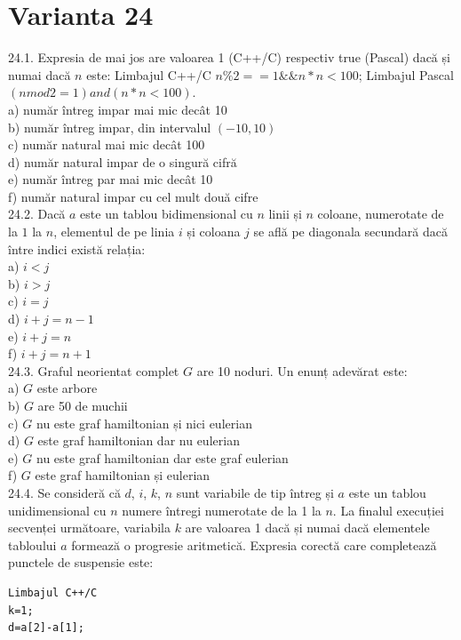 {{\section*{Varianta 24}

24.1. Expresia de mai jos are valoarea 1 (C++/C) respectiv true (Pascal) dacă și numai dacă $n$ este: Limbajul C++/C $n \% 2==1 \&\& n * n<100$; Limbajul Pascal $(n mod 2=1) and (n * n<100)$.
\\
a) număr întreg impar mai mic decât 10
\\
b) număr întreg impar, din intervalul $(-10,10)$
\\
c) număr natural mai mic decât 100
\\
d) număr natural impar de o singură cifră
\\
e) număr întreg par mai mic decât 10
\\
f) număr natural impar cu cel mult două cifre
\\
24.2. Dacă $a$ este un tablou bidimensional cu $n$ linii și $n$ coloane, numerotate de la $1$ la $n$, elementul de pe linia $i$ și coloana $j$ se află pe diagonala secundară dacă între indici există relația:
\\
a) $i<j$
\\
b) $i>j$
\\
c) $i=j$
\\
d) $i+j=n-1$
\\
e) $i+j=n$
\\
f) $i+j=n+1$
\\
24.3. Graful neorientat complet $G$ are 10 noduri. Un enunț adevărat este:
\\
a) $G$ este arbore
\\
b) $G$ are 50 de muchii
\\
c) $G$ nu este graf hamiltonian și nici eulerian
\\
d) $G$ este graf hamiltonian dar nu eulerian
\\
e) $G$ nu este graf hamiltonian dar este graf eulerian
\\
f) $G$ este graf hamiltonian și eulerian
\\
24.4. Se consideră că $d$, $i$, $k$, $n$ sunt variabile de tip întreg și $a$ este un tablou unidimensional cu $n$ numere întregi numerotate de la 1 la $n$. La finalul execuției secvenței următoare, variabila $k$ are valoarea 1 dacă și numai dacă elementele tabloului $a$ formează o progresie aritmetică. Expresia corectă care completează punctele de suspensie este:
\begin{verbatim}
Limbajul C++/C
k=1;
d=a[2]-a[1];

\end{verbatim}}}
